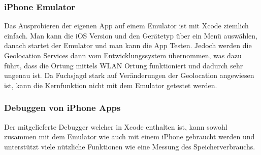 \subsubsection{iPhone Emulator} %
\label{ssub:iPhone Emulator}
Das Ausprobieren der eigenen App auf einem Emulator ist mit Xcode ziemlich einfach. Man kann die iOS Version und den Gerätetyp über ein Menü auswählen, danach startet der Emulator und man kann die App Testen. Jedoch werden die Geolocation Services dann vom Entwicklungssystem übernommen, was dazu führt, dass die Ortung mittels WLAN Ortung funktioniert und dadurch sehr ungenau ist. Da Fuchsjagd stark auf Veränderungen der Geolocation angewiesen ist, kann die Kernfunktion nicht mit dem Emulator getestet werden.

\subsubsection{Debuggen von iPhone Apps} %
\label{ssub: Debuggen}
Der mitgelieferte Debugger welcher in Xcode enthalten ist, kann sowohl zusammen mit dem Emulator wie auch mit einem iPhone gebraucht werden und unterstützt viele nützliche Funktionen wie eine Messung des Speicherverbrauchs.

